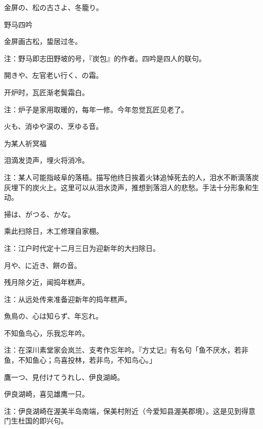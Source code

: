 \begin{haiku}
    {\FH 金屏の、松の古さよ、冬籠り。}

    {\FK 野马四吟}

    {\FK 金屏画古松，蛰居过冬。}

    {\FT 注：野马即志田野坡的号，『炭包』的作者。四吟是四人的联句。}
\end{haiku}

\begin{haiku}
    {\FH {}開きや、左官老い行く、の霜。}

    {\FK 开炉时，瓦匠渐老鬓霜白。}

    {\FT 注：炉子是家用取暖的，每年一修。今年忽觉瓦匠见老了。}
\end{haiku}

\begin{haiku}
    {\FH {}火も、消ゆや涙の、烹ゆる音。}

    {\FK 为某人祈冥福}

    {\FK 泪滴发烫声，埋火将消冷。}

    {\FT 注：某人可能指岐阜的落梧。描写他终日挨着火钵追悼死去的人，泪水不断滴落炭灰埋下的炭火上。这里可以从泪水烫声，推想到落泪人的悲愁。手法十分形象和生动。}
\end{haiku}

\begin{haiku}
    {\FH {}掃は、がつる、かな。}

    {\FK 乘此扫除日，木工修理自家棚。}

    {\FT 注：江户时代定十二月三日为迎新年的大扫除日。}
\end{haiku}

\begin{haiku}
    {\FH 月や、に近き、餅の音。}

    {\FK 残月除夕近，闻捣年糕声。}

    {\FT 注：从远处传来准备迎新年的捣年糕声。}
\end{haiku}

\begin{haiku}
    {\FH 魚鳥の、心は知らず、年忘れ。}

    {\FK 不知鱼鸟心，乐我忘年吟。}

    {\FT 注：在深川素堂家会岚兰、支考作忘年吟。『方丈记』有名句「鱼不厌水，若非鱼，不知鱼心；鸟喜投林，若非鸟，不知鸟心。」}
\end{haiku}

\begin{haiku}
    {\FH 鷹一つ、見付けてうれし、伊良湖崎。}

    {\FK 伊良湖崎，喜见雄鹰一只。}

    {\FT 注：伊良湖崎在渥美半岛南端，保美村附近（今爱知县渥美郡境）。这是见到得意门生杜国的即兴句。}
\end{haiku}

